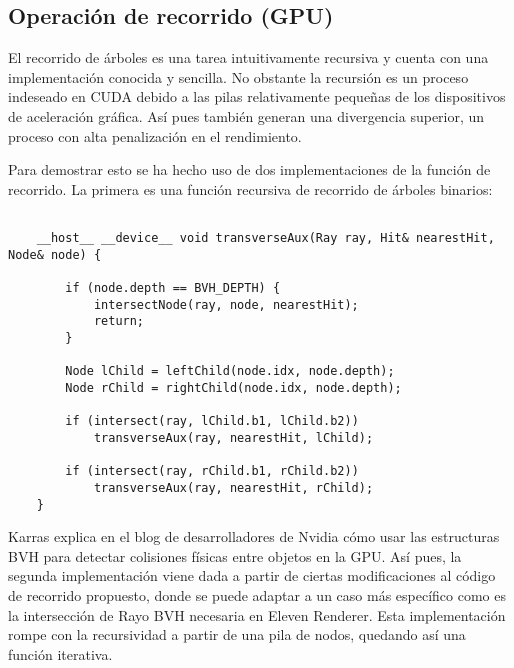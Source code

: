 \subsection{Operación de recorrido (GPU)}
	
El recorrido de árboles es una tarea intuitivamente recursiva y cuenta con una implementación conocida y sencilla. No obstante la recursión es un proceso indeseado en CUDA debido a las pilas relativamente pequeñas de los dispositivos de aceleración gráfica. Así pues también generan una divergencia superior, un proceso con alta penalización en el rendimiento.

Para demostrar esto se ha hecho uso de dos implementaciones de la función de recorrido. La primera es una función recursiva de recorrido de árboles binarios:

\begin{minipage}[c]{0.95\textwidth}
\begin{lstlisting}[label={cod:bvhtransversalrec}, caption={Recorrido del árbol BVH recursivo}]
	
	__host__ __device__ void transverseAux(Ray ray, Hit& nearestHit, Node& node) {
	
		if (node.depth == BVH_DEPTH) {
			intersectNode(ray, node, nearestHit);
			return;
		}
	
		Node lChild = leftChild(node.idx, node.depth);
		Node rChild = rightChild(node.idx, node.depth);
	
		if (intersect(ray, lChild.b1, lChild.b2))
			transverseAux(ray, nearestHit, lChild);
		
		if (intersect(ray, rChild.b1, rChild.b2))
			transverseAux(ray, nearestHit, rChild);		
	}

\end{lstlisting}
\end{minipage}
	
Karras explica en el blog de desarrolladores de Nvidia \cite{karrastransversal} cómo usar las estructuras BVH para detectar colisiones físicas entre objetos en la GPU. Así pues, la segunda implementación viene dada a partir de ciertas modificaciones al código de recorrido propuesto, donde se puede adaptar a un caso más específico como es la intersección de Rayo \- BVH necesaria en Eleven Renderer. Esta implementación rompe con la recursividad a partir de una pila de nodos, quedando así una función iterativa.

